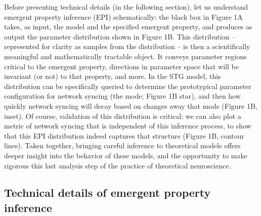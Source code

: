\documentclass[11pt]{article}
\begin{document}
Before presenting technical details (in the following section), let us understand emergent property inference (EPI) schematically:  the black box in Figure 1A takes, as input, the model and the specified emergent property, and produces as output the parameter distribution shown in Figure 1B.  
This distribution -- represented for clarity as samples from the distribution -- is then a scientifically meaningful and mathematically tractable object.  
It conveys parameter regions critical to the emergent property, directions in parameter space that will be invariant (or not) to that property, and more.  
In the STG model, this distribution can be specifically queried to determine the prototypical parameter configuration for network syncing (the mode; Figure 1B star), and then how quickly network syncing will decay based on changes away that mode (Figure 1B, inset).  
Of course, validation of this distribution is critical: we can also plot a metric of network syncing that is independent of this inference process, to show that this EPI distribution indeed captures that structure (Figure 1B, contour lines).
Taken together, bringing careful inference to theoretical models offers deeper insight into the behavior of these models, and the opportunity to make rigorous this last analysis step of the practice of theoretical neuroscience.

\subsection{Technical details of emergent property inference}
\end{document}
